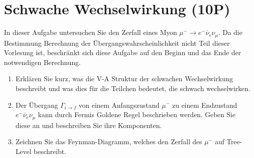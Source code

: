 \documentclass{exercise}
\begin{document}
\section{Schwache Wechselwirkung (10P)}

In dieser Aufgabe untersuchen Sie den Zerfall eines Myon $\mu^- \to e^- \overline{\nu}_{e} \nu_\mu$. 
Da die Bestimmung Berechnung der Übergangswahrscheinlichkeit nicht Teil dieser Vorlesung ist, beschränkt sich diese Aufgabe auf den Beginn und das Ende der notwendigen Berechnung.

\begin{enumerate}
    \item Erklären Sie kurz, was die V-A Struktur der schwachen Wechselwirkung beschreibt und was dies für die Teilchen bedeutet, die schwach wechselwirken.


    \item Der Übergang $\Gamma_{i \to f}$ von einem Anfangszustand $\mu^- $ zu einem Endzustand $e^- \overline{\nu}_{e} \nu_\mu $ kann durch Fermis Goldene Regel beschrieben werden.
    Geben Sie diese an und beschreiben Sie ihre Komponenten.





    \item Zeichnen Sie das Feynman-Diagramm, welches den Zerfall des $\mu^-$ auf Tree-Level beschreibt.

\end{enumerate}
\end{document}
